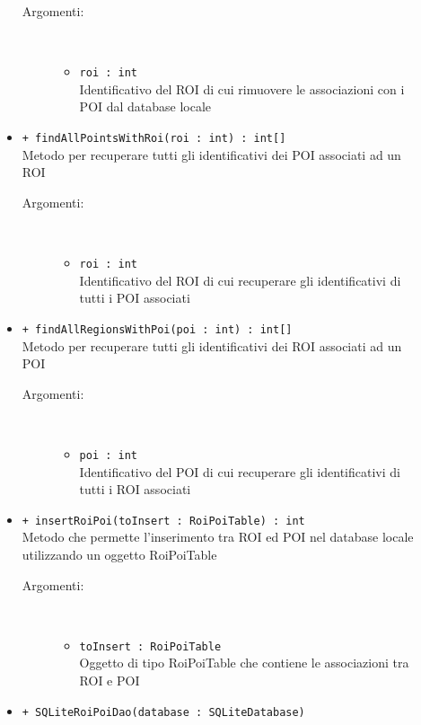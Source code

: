\documentclass[../DefinizioneDiProdotto.tex]{subfiles}
\begin{document}
\begin{description}
\begin{itemize}
 \begin{description}
\item[Argomenti:] \
\begin{itemize}
\item \texttt{roi : int}\\
Identificativo del ROI di cui rimuovere le associazioni con i POI dal database locale\end{itemize}
\end{description}
\item \texttt{+ findAllPointsWithRoi(roi : int) : int[]}\\
Metodo per recuperare tutti gli identificativi dei POI associati ad un ROI 
 \begin{description}
\item[Argomenti:] \
\begin{itemize}
\item \texttt{roi : int}\\
Identificativo del ROI di cui recuperare gli identificativi di tutti i POI associati\end{itemize}
\end{description}
\item \texttt{+ findAllRegionsWithPoi(poi : int) : int[]}\\
Metodo per recuperare tutti gli identificativi dei ROI associati ad un POI 
 \begin{description}
\item[Argomenti:] \
\begin{itemize}
\item \texttt{poi : int}\\
Identificativo del POI di cui recuperare gli identificativi di tutti i ROI associati\end{itemize}
\end{description}
\item \texttt{+ insertRoiPoi(toInsert : RoiPoiTable) : int}\\
Metodo che permette l'inserimento tra ROI ed POI nel database locale utilizzando un oggetto RoiPoiTable
 \begin{description}
\item[Argomenti:] \
\begin{itemize}
\item \texttt{toInsert : RoiPoiTable}\\
Oggetto di tipo RoiPoiTable che contiene le associazioni tra ROI e POI\end{itemize}
\end{description}
\item \texttt{+ SQLiteRoiPoiDao(database : SQLiteDatabase)}\\

\end{itemize}
\end{description}
\end{document}
